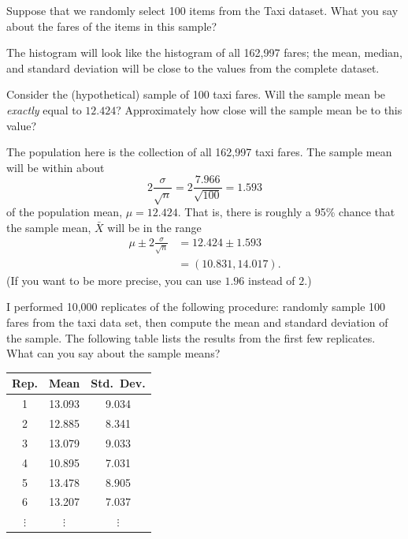 \documentclass[11pt]{exam}
\begin{document}
\begin{questions}
\newpage
\question \label{ques:taxi-sample} Suppose that we randomly select 100 items from the Taxi dataset. What you
say about the fares of the items in this sample?

\begin{solution}
  The histogram will look like the histogram of all 162,997 fares; the mean,
  median, and standard deviation will be close to the values from the complete
  dataset.
\end{solution}

\vfill 


\question Consider the (hypothetical) sample of 100 taxi fares. Will the
sample mean be \emph{exactly} equal to $12.424$? Approximately how close will
the sample mean be to this value?

\begin{solution}
  The population here is the collection of all 162,997 taxi fares.
  The sample mean will be within about
  \[
    2 \frac{\sigma}{\sqrt{n}} = 2 \frac{7.966}{\sqrt{100}} = 1.593
  \]
  of the population mean, $\mu = 12.424$. That is, there is roughly a 95\%
  chance that the sample mean, $\bar X$ will be in the range
  \begin{align*}
    \mu \pm 2 \frac{\sigma}{\sqrt{n}}
      &= 12.424 \pm  1.593 \\
      &= (10.831, 14.017).
  \end{align*}
  (If you want to be more precise, you can use $1.96$ instead of $2$.)
  
\end{solution}


\vfill

\question I performed 10,000 replicates of the following procedure:
randomly sample 100 fares from the taxi data set, then compute the mean and
standard deviation of the sample. The following table lists the results from
the first few replicates. What can you say about the sample means?

\vspace{\baselineskip}
\begin{tabular}{ccc}
  \toprule
  Rep. & Mean & Std.~Dev. \\
  \midrule
  1 & 13.093 & 9.034 \\
  2 & 12.885 & 8.341 \\
  3 & 13.079 & 9.033 \\
  4 & 10.895 & 7.031 \\
  5 & 13.478 & 8.905 \\
  6 & 13.207 & 7.037 \\
  $\vdots$ & $\vdots$ & $\vdots$ \\
  \bottomrule
\end{tabular}
\vspace{\baselineskip}


\end{questions}
\end{document}
